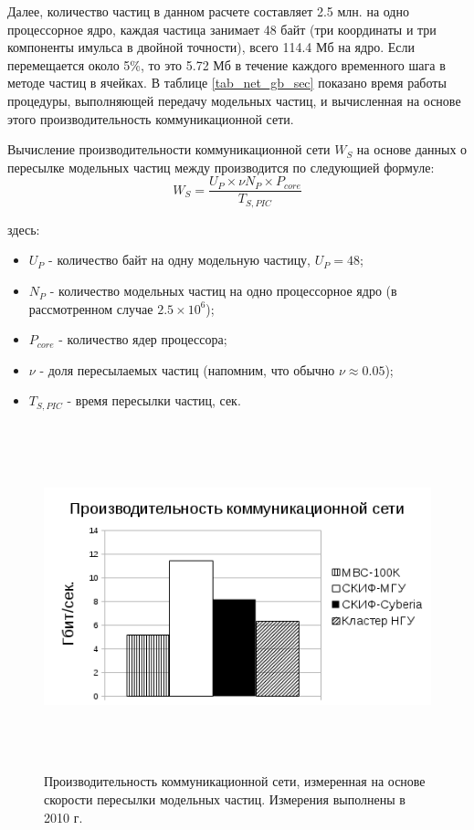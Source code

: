 Далее, количество частиц в данном расчете составляет 2.5 млн. на одно процессорное ядро, каждая частица занимает 48 байт (три координаты и три компоненты имульса в двойной точности), всего 114.4 Мб на ядро. Если перемещается около 5\%, то это 5.72 Мб в течение каждого временного шага в методе частиц в ячейках. В таблице \ref{tab_net_gb_sec} показано время работы процедуры, выполняющей передачу модельных частиц, и вычисленная на основе этого производительность коммуникационной сети.


Вычисление производительности коммуникационной сети $W_S$ на основе данных о пересылке модельных частиц между  производится по следующией формуле:
\begin{equation}
W_S = \frac{U_P\times \nu N_P \times P_{core}}{T_{S,PIC}}
\label{Net_performance_peer}
\end{equation}


здесь:
\begin{itemize}
	\item $U_P$ - количество байт на одну модельную частицу, $U_P = 48$;
	\item $N_P$ - количество модельных частиц на одно процессорное ядро (в рассмотренном случае $2.5\times 10^6$);  
	\item $P_{core}$ - количество ядер процессора;
	\item $\nu$ - доля пересылаемых частиц (напомним, что обычно $\nu \approx 0.05$);
	\item $T_{S,PIC}$  - время пересылки частиц, сек.
\end{itemize}	



\begin{figure}[htb]
	\begin{center}
		\includegraphics[height=10cm,keepaspectratio]{images/PIC_RAM_Gb_sec.png}
	\end{center}
	\caption{Производительность коммуникационной сети, измеренная на основе скорости пересылки модельных частиц. Измерения выполнены в 2010 г.}
	\label{plot_net_gb_sec}
\end{figure} 

